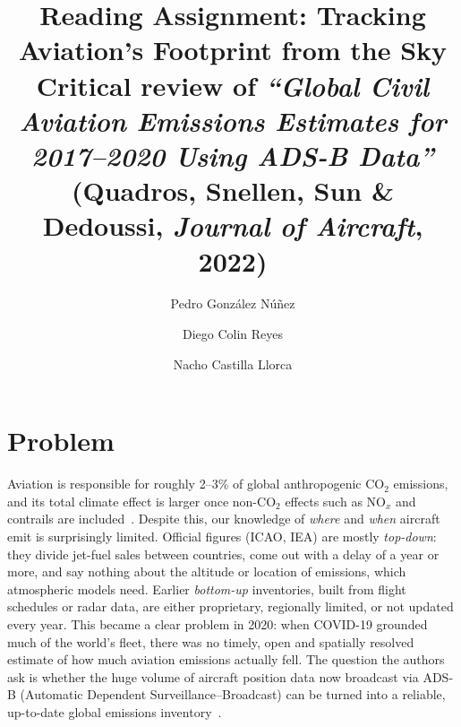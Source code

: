 \documentclass[11pt,a4paper]{article}
\title{\vspace{-1.5cm}\large\textbf{Reading Assignment: Tracking Aviation's Footprint from the Sky}\\[2pt]
\normalsize Critical review of \emph{``Global Civil Aviation Emissions Estimates for 2017--2020 Using ADS-B Data''}\\
(Quadros, Snellen, Sun \& Dedoussi, \emph{Journal of Aircraft}, 2022)}
\author{Pedro Gonz\'alez N\'u\~nez \and Diego Colin Reyes \and Nacho Castilla Llorca}
\date{}
\begin{document}
\maketitle
\vspace{-1.2cm}

\section{Problem}
Aviation is responsible for roughly 2--3\% of global anthropogenic CO$_2$ emissions, and its total
climate effect is larger once non-CO$_2$ effects such as NO$_x$ and contrails are included~\cite{lee2021}.
Despite this, our knowledge of \emph{where} and \emph{when} aircraft emit is surprisingly limited.
Official figures (ICAO, IEA) are mostly \emph{top-down}: they divide jet-fuel sales between countries,
come out with a delay of a year or more, and say nothing about the altitude or location of emissions,
which atmospheric models need. Earlier \emph{bottom-up} inventories, built from flight schedules or
radar data, are either proprietary, regionally limited, or not updated every year. This became a clear
problem in 2020: when COVID-19 grounded much of the world's fleet, there was no timely, open and
spatially resolved estimate of how much aviation emissions actually fell. The question the authors ask
is whether the huge volume of aircraft position data now broadcast via ADS-B (Automatic Dependent
Surveillance--Broadcast) can be turned into a reliable, up-to-date global emissions inventory~\cite{quadros2022}.
\end{document}

